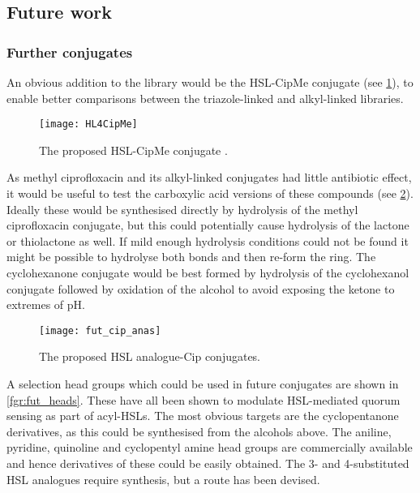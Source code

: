 \subsection{Future work \label{sec:Fut2}}

\subsubsection{Further conjugates}

An obvious addition to the library would be the HSL-CipMe conjugate (see \ref{fgr:HL4CipMe}), to enable better comparisons between the triazole-linked and alkyl-linked libraries.

\begin{figure}[H]
	\begin{center}
		\texttt{[image: HL4CipMe]}
		\caption{The proposed HSL-CipMe conjugate .
		\label{fgr:HL4CipMe}}
	\end{center}
\end{figure}

As methyl ciprofloxacin  and its alkyl-linked conjugates had little antibiotic effect, it would be useful to test the carboxylic acid versions of these compounds (see \ref{fgr:fut_cip_anas}). Ideally these would be synthesised directly by hydrolysis of the methyl ciprofloxacin conjugate, but this could potentially cause hydrolysis of the lactone or thiolactone as well. If mild enough hydrolysis conditions could not be found it might be possible to hydrolyse both bonds and then re-form the ring\cite{Witiak1978}. The cyclohexanone conjugate would be best formed by hydrolysis of the cyclohexanol conjugate followed by oxidation of the alcohol to avoid exposing the ketone to extremes of pH.

\begin{figure}[H]
	\begin{center}
		\texttt{[image: fut\_cip\_anas]}
		\caption{The proposed HSL analogue-Cip conjugates.
		\label{fgr:fut_cip_anas}}
	\end{center}
\end{figure}

A selection head groups which could be used in future conjugates are shown in \ref{fgr:fut_heads}. These have all been shown to modulate HSL-mediated quorum sensing as part of acyl-HSLs\cite{Smith2003a,Welch2005,Ishida2007,Olsen2002,Smith2003,Hodgkinson2012a,Marsden2010}. The most obvious targets are the cyclopentanone derivatives, as this could be synthesised from the alcohols above. The aniline, pyridine, quinoline and cyclopentyl amine head groups are commercially available and hence derivatives of these could be easily obtained. The 3- and 4-substituted HSL analogues require synthesis, but a route has been devised\cite{Olsen2002}.

